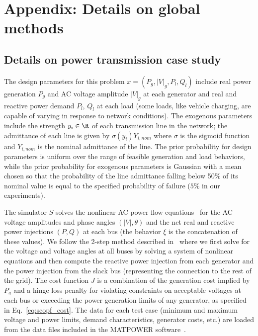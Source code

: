 \section{Appendix: Details on global methods}

\subsection{Details on power transmission case study}

The design parameters for this problem $x = (P_g, |V|_g, P_l, Q_l)$ include real power generation $P_g$ and AC voltage amplitude $|V|_g$ at each generator and real and reactive power demand $P_l$, $Q_l$ at each load (some loads, like vehicle charging, are capable of varying in response to network conditions). The exogenous parameters include the strength $y_i \in \R$ of each transmission line in the network; the admittance of each line is given by $\sigma(y_i) Y_{i, nom}$ where $\sigma$ is the sigmoid function and $Y_{i, nom}$ is the nominal admittance of the line. The prior probability for design parameters is uniform over the range of feasible generation and load behaviors, while the prior probability for exogenous parameters is Gaussian with a mean chosen so that the probability of the line admittance falling below 50\% of its nominal value is equal to the specified probability of failure ($5\%$ in our experiments).

The simulator $S$ solves the nonlinear AC power flow equations~\cite{dontiAdversariallyRobustLearning2021,dontiDC3LearningMethod2021} for the AC voltage amplitudes and phase angles $(|V|, \theta)$ and the net real and reactive power injections $(P, Q)$ at each bus (the behavior $\xi$ is the concatenation of these values). We follow the 2-step method described in~\cite{dontiDC3LearningMethod2021} where we first solve for the voltage and voltage angles at all buses by solving a system of nonlinear equations and then compute the reactive power injection from each generator and the power injection from the slack bus (representing the connection to the rest of the grid). The cost function $J$ is a combination of the generation cost implied by $P_g$ and a hinge loss penalty for violating constraints on acceptable voltages at each bus or exceeding the power generation limits of any generator, as specified in Eq.~\ref{eq:scopf_cost}. The data for each test case (minimum and maximum voltage and power limits, demand characteristics, generator costs, etc.) are loaded from the data files included in the MATPOWER software~\cite{zimmermanMATPOWERSteadyStateOperations2011}.